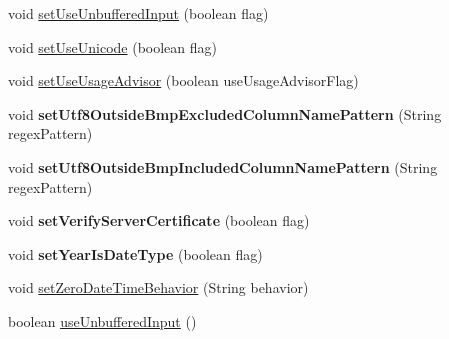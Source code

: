 \begin{DoxyCompactItemize}
\item 
void \mbox{\hyperlink{classcom_1_1mysql_1_1jdbc_1_1_multi_host_my_s_q_l_connection_a19da5784ea3e4f024042178f171d0441}{set\+Use\+Unbuffered\+Input}} (boolean flag)
\item 
void \mbox{\hyperlink{classcom_1_1mysql_1_1jdbc_1_1_multi_host_my_s_q_l_connection_afcdd021cd65ac9c824bf069c3d52a22b}{set\+Use\+Unicode}} (boolean flag)
\item 
void \mbox{\hyperlink{classcom_1_1mysql_1_1jdbc_1_1_multi_host_my_s_q_l_connection_a7a7245490c0727f69175b55bb9d7c39b}{set\+Use\+Usage\+Advisor}} (boolean use\+Usage\+Advisor\+Flag)
\item 
\mbox{\label{classcom_1_1mysql_1_1jdbc_1_1_multi_host_my_s_q_l_connection_ab2323c98b23abdf3eb4327b7a8ff0479}} 
void {\bfseries set\+Utf8\+Outside\+Bmp\+Excluded\+Column\+Name\+Pattern} (String regex\+Pattern)
\item 
\mbox{\label{classcom_1_1mysql_1_1jdbc_1_1_multi_host_my_s_q_l_connection_a7b5a87c0ae2aa78ee67c74819017f3ad}} 
void {\bfseries set\+Utf8\+Outside\+Bmp\+Included\+Column\+Name\+Pattern} (String regex\+Pattern)
\item 
\mbox{\label{classcom_1_1mysql_1_1jdbc_1_1_multi_host_my_s_q_l_connection_a73db7668b99212f0fac60533d9e44db6}} 
void {\bfseries set\+Verify\+Server\+Certificate} (boolean flag)
\item 
\mbox{\label{classcom_1_1mysql_1_1jdbc_1_1_multi_host_my_s_q_l_connection_a1a4ea5426ee18a571038d556fe474e64}} 
void {\bfseries set\+Year\+Is\+Date\+Type} (boolean flag)
\item 
void \mbox{\hyperlink{classcom_1_1mysql_1_1jdbc_1_1_multi_host_my_s_q_l_connection_a236306cd02b385607ef0b443508b4f89}{set\+Zero\+Date\+Time\+Behavior}} (String behavior)
\item 
boolean \mbox{\hyperlink{classcom_1_1mysql_1_1jdbc_1_1_multi_host_my_s_q_l_connection_a5a985fc8b9a0777d6d19e566e8053832}{use\+Unbuffered\+Input}} ()
\item 
\mbox{\label{classcom_1_1mysql_1_1jdbc_1_1_multi_host_my_s_q_l_connection_a6d5952e1650a9642cf0d8d7441132e77}} 

\end{DoxyCompactItemize}

